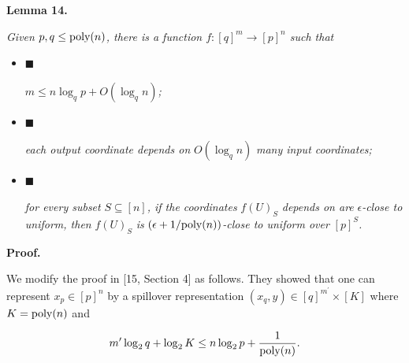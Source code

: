 \documentclass[10pt,a4paper]{article}
\begin{document}


\par\medskip\noindent\textbf{
\textbf{Lemma 14}\textbf{.}
}\par



\emph{Given $p,q\leq\textnormal{poly}(n)$, there is a function $f\colon[q]^{m}\to[p]^{n}$ such that}\par


\begin{itemize}


\item[] 
$\blacksquare$ 


$m\leq n\log_{q}p+O(\log_{q}n)$\emph{;}\par





\item[] 
$\blacksquare$ 


\emph{each output coordinate depends on }$O(\log_{q}n)$\emph{ many input coordinates;}\par





\item[] 
$\blacksquare$ 


\emph{for every subset }$S\subseteq[n]$\emph{, if the coordinates }$f(U)_{S}$\emph{ depends on are }$\epsilon$\emph{-close to uniform, then }$f(U)_{S}$\emph{ is }$(\epsilon+1/\textnormal{poly}(n))$\emph{-close to uniform over }$[p]^{S}$\emph{.}\par





\end{itemize}







\par\medskip\noindent\textbf{Proof.}\par




We modify the proof in [15, Section 4] as follows.
They showed that one can represent $x_{p}\in[p]^{n}$ by a spillover representation $(x_{q},y)\in[q]^{m^{\prime}}\times[K]$ where $K=\textnormal{poly}(n)$ and\par


\[\begin{gathered}
m^{\prime}\log_{2}q+\log_{2}K\leq n\log_{2}p+\frac{1}{\textnormal{poly}(n)}.
\end{gathered}\]
\end{document}
